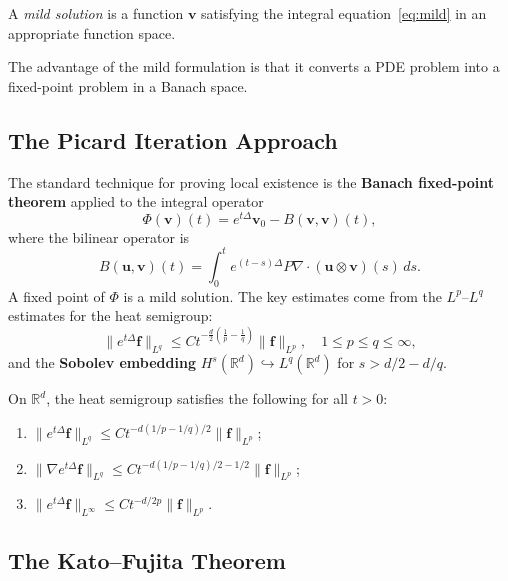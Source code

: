 \begin{definition}
A \textit{mild solution} is a function $\mathbf{v}$ satisfying the integral equation~\eqref{eq:mild} in an appropriate function space.
\end{definition}

The advantage of the mild formulation is that it converts a PDE problem into a fixed-point problem in a Banach space.

\subsection{The Picard Iteration Approach}

The standard technique for proving local existence is the \textbf{Banach fixed-point theorem} applied to the integral operator
\[
\Phi(\mathbf{v})(t) = e^{t\Delta} \mathbf{v}_0 - B(\mathbf{v}, \mathbf{v})(t),
\]
where the bilinear operator is
\[
B(\mathbf{u}, \mathbf{v})(t) = \int_0^t e^{(t-s)\Delta} P \nabla \cdot (\mathbf{u} \otimes \mathbf{v})(s) \, ds.
\]
A fixed point of $\Phi$ is a mild solution. The key estimates come from the $L^p$--$L^q$ estimates for the heat semigroup:
\begin{equation}
\label{eq:heat-est}
\|e^{t\Delta} \mathbf{f}\|_{L^q} \le C t^{-\frac{d}{2}\left(\frac{1}{p} - \frac{1}{q}\right)} \|\mathbf{f}\|_{L^p}, \quad 1 \le p \le q \le \infty,
\end{equation}
and the \textbf{Sobolev embedding} $H^s(\mathbb{R}^d) \hookrightarrow L^q(\mathbb{R}^d)$ for $s > d/2 - d/q$.

\begin{lemma}
\label{lem:heat}
On $\mathbb{R}^d$, the heat semigroup satisfies the following for all $t > 0$:
\begin{enumerate}
\item $\|e^{t\Delta} \mathbf{f}\|_{L^q} \le C t^{-d(1/p - 1/q)/2} \|\mathbf{f}\|_{L^p}$;
\item $\|\nabla e^{t\Delta} \mathbf{f}\|_{L^q} \le C t^{-d(1/p - 1/q)/2 - 1/2} \|\mathbf{f}\|_{L^p}$;
\item $\|e^{t\Delta} \mathbf{f}\|_{L^\infty} \le C t^{-d/2p} \|\mathbf{f}\|_{L^p}$.
\end{enumerate}
\end{lemma}

\subsection{The Kato--Fujita Theorem}

